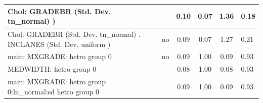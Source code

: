 \begin{table}
\begin{center}
\begin{tabular}{|l|l|c|c|c|l|}
			\hline
			 Chol: GRADEBR (Std. Dev. tn_normal) ) &  & 0.10 & 0.07 & 1.36 & 0.18 \\
			\hline
			 Chol: GRADEBR (Std. Dev. tn_normal) . INCLANES (Std. Dev.   uniform ) & no & 0.09 & 0.07 & 1.27 & 0.21 \\
			\hline
			main: MXGRADE: hetro group 0 & no & 0.09 & 1.00 & 0.09 & 0.93 \\
			\hline
			MEDWIDTH: hetro group 0 &  & 0.08 & 1.00 & 0.08 & 0.93 \\
			\hline
			main: MXGRADE: hetro group 0:ln_normal:sd  hetro group 0 &  & 0.09 & 1.00 & 0.09 & 0.93 \\
			\hline
		\end{tabular}
	\end{center}
\end{table}